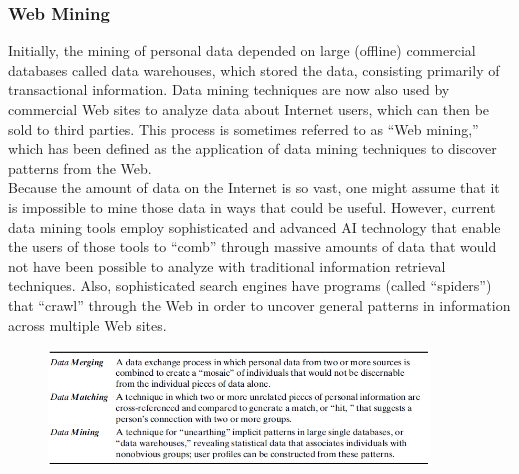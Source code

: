\documentclass[12pt]{article}
\theoremstyle{definition}
\begin{document}
\subsubsection{Web Mining}
Initially, the mining of personal data depended on large (offline) commercial databases
called data warehouses, which stored the data, consisting primarily of transactional
information. Data mining techniques are now also used by commercial Web sites to
analyze data about Internet users, which can then be sold to third parties. This process is
sometimes referred to as “Web mining,” which has been defined as the application of
data mining techniques to discover patterns from the Web.\\
Because the amount of data on the Internet is so vast, one might assume that
it is impossible to mine those data in ways that could be useful. However, current data
mining tools employ sophisticated and advanced AI technology that enable the users of those tools to “comb” through massive amounts of data that would not have been
possible to analyze with traditional information retrieval techniques. Also, sophisticated
search engines have programs (called “spiders”) that “crawl” through the Web in order
to uncover general patterns in information across multiple Web sites.\\
\begin{figure}[h]
\centering
\includegraphics[width=0.9\textwidth]{6.png}
\end{figure}
\end{document}
